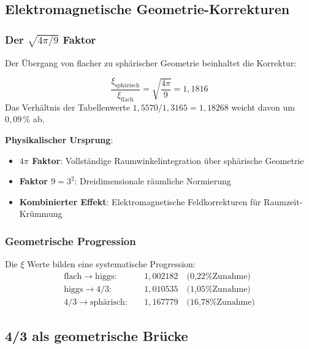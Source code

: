 	\subsection{Elektromagnetische Geometrie-Korrekturen}
	\label{subsec:em_korrekturen}
	
	\subsubsection{Der $\sqrt{4\pi/9}$ Faktor}
	\label{subsubsec:korrekturfaktor}
	
	Der Übergang von flacher zu sphärischer Geometrie beinhaltet die Korrektur:
	
	\begin{equation}
		\frac{\xi_{\text{sphärisch}}}{\xi_{\text{flach}}} = \sqrt{\frac{4\pi}{9}} = 1{,}1816
		\label{eq:em_korrektur}
	\end{equation}
	Das Verhältnis der Tabellenwerte $1{,}5570/1{,}3165=1{,}18268$ weicht davon um $0{,}09\,\%$ ab.
	
	\textbf{Physikalischer Ursprung}:
	\begin{itemize}
		\item \textbf{$4\pi$ Faktor}: Vollständige Raumwinkelintegration über sphärische Geometrie
		\item \textbf{Faktor $9 = 3^2$}: Dreidimensionale räumliche Normierung
		\item \textbf{Kombinierter Effekt}: Elektromagnetische Feldkorrekturen für Raumzeit-Krümmung
	\end{itemize}
	
	\subsubsection{Geometrische Progression}
	\label{subsubsec:geometrische_progression}
	
	Die $\xi$ Werte bilden eine systematische Progression:
	\begin{align}
		\text{flach} \rightarrow \text{higgs}: \quad &1{,}002182 \quad \text{(0{,}22\% Zunahme)} \\
		\text{higgs} \rightarrow \text{4/3}: \quad &1{,}010535 \quad \text{(1{,}05\% Zunahme)} \\
		\text{4/3} \rightarrow \text{sphärisch}: \quad &1{,}167779 \quad \text{(16{,}78\% Zunahme)}
	\end{align}
	
	\subsection{4/3 als geometrische Brücke}
	\label{subsec:vier_drittel_bruecke}
	
